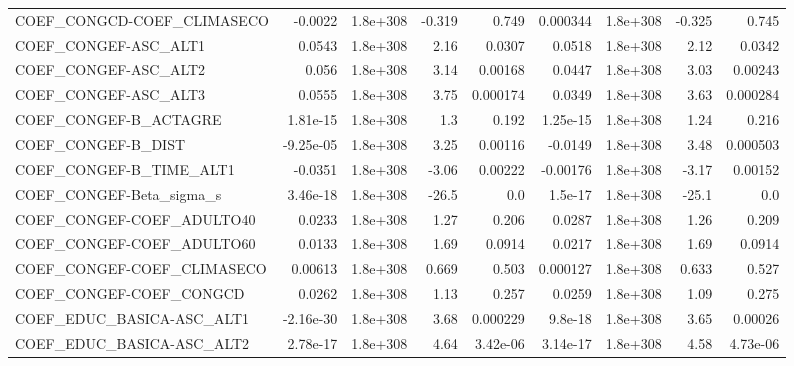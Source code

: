 \begin{tabular}{lrrrrrrrr}
COEF\_CONGCD-COEF\_CLIMASECO        &     -0.0022 &     1.8e+308 &    -0.319 &    0.749 &   0.000344 &    1.8e+308 &       -0.325 &         0.745 \\
COEF\_CONGEF-ASC\_ALT1              &      0.0543 &     1.8e+308 &      2.16 &   0.0307 &     0.0518 &    1.8e+308 &         2.12 &        0.0342 \\
COEF\_CONGEF-ASC\_ALT2              &       0.056 &     1.8e+308 &      3.14 &  0.00168 &     0.0447 &    1.8e+308 &         3.03 &       0.00243 \\
COEF\_CONGEF-ASC\_ALT3              &      0.0555 &     1.8e+308 &      3.75 & 0.000174 &     0.0349 &    1.8e+308 &         3.63 &      0.000284 \\
COEF\_CONGEF-B\_ACTAGRE             &    1.81e-15 &     1.8e+308 &       1.3 &    0.192 &   1.25e-15 &    1.8e+308 &         1.24 &         0.216 \\
COEF\_CONGEF-B\_DIST                &   -9.25e-05 &     1.8e+308 &      3.25 &  0.00116 &    -0.0149 &    1.8e+308 &         3.48 &      0.000503 \\
COEF\_CONGEF-B\_TIME\_ALT1           &     -0.0351 &     1.8e+308 &     -3.06 &  0.00222 &   -0.00176 &    1.8e+308 &        -3.17 &       0.00152 \\
COEF\_CONGEF-Beta\_sigma\_s          &    3.46e-18 &     1.8e+308 &     -26.5 &      0.0 &    1.5e-17 &    1.8e+308 &        -25.1 &           0.0 \\
COEF\_CONGEF-COEF\_ADULTO40         &      0.0233 &     1.8e+308 &      1.27 &    0.206 &     0.0287 &    1.8e+308 &         1.26 &         0.209 \\
COEF\_CONGEF-COEF\_ADULTO60         &      0.0133 &     1.8e+308 &      1.69 &   0.0914 &     0.0217 &    1.8e+308 &         1.69 &        0.0914 \\
COEF\_CONGEF-COEF\_CLIMASECO        &     0.00613 &     1.8e+308 &     0.669 &    0.503 &   0.000127 &    1.8e+308 &        0.633 &         0.527 \\
COEF\_CONGEF-COEF\_CONGCD           &      0.0262 &     1.8e+308 &      1.13 &    0.257 &     0.0259 &    1.8e+308 &         1.09 &         0.275 \\
COEF\_EDUC\_BASICA-ASC\_ALT1         &   -2.16e-30 &     1.8e+308 &      3.68 & 0.000229 &    9.8e-18 &    1.8e+308 &         3.65 &       0.00026 \\
COEF\_EDUC\_BASICA-ASC\_ALT2         &    2.78e-17 &     1.8e+308 &      4.64 & 3.42e-06 &   3.14e-17 &    1.8e+308 &         4.58 &      4.73e-06 \\

\end{tabular}

